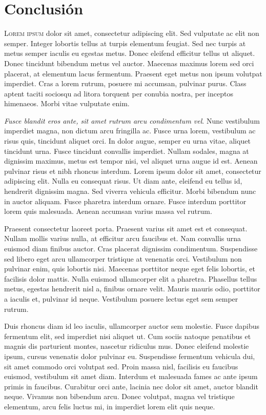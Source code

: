 \chapter*{Conclusión}



\noindent\textsc{Lorem ipsum} dolor sit amet, consectetur adipiscing elit. Sed vulputate ac elit non semper. Integer lobortis tellus at turpis elementum feugiat. Sed nec turpis at metus semper iaculis eu egestas metus. Donec eleifend efficitur tellus ut aliquet. Donec tincidunt bibendum metus vel auctor. Maecenas maximus lorem sed orci placerat, at elementum lacus fermentum. Praesent eget metus non ipsum volutpat imperdiet. Cras a lorem rutrum, posuere mi accumsan, pulvinar purus. Class aptent taciti sociosqu ad litora torquent per conubia nostra, per inceptos himenaeos. Morbi vitae vulputate enim.

\emph{Fusce blandit eros ante, sit amet rutrum arcu condimentum vel}. Nunc vestibulum imperdiet magna, non dictum arcu fringilla ac. Fusce urna lorem, vestibulum ac risus quis, tincidunt aliquet orci. In dolor augue, semper eu urna vitae, aliquet tincidunt urna. Fusce tincidunt convallis imperdiet. Nullam sodales, magna at dignissim maximus, metus est tempor nisi, vel aliquet urna augue id est. Aenean pulvinar risus et nibh rhoncus interdum. Lorem ipsum dolor sit amet, consectetur adipiscing elit. Nulla eu consequat risus. Ut diam ante, eleifend eu tellus id, hendrerit dignissim magna. Sed viverra vehicula efficitur. Morbi bibendum nunc in auctor aliquam. Fusce pharetra interdum ornare. Fusce interdum porttitor lorem quis malesuada. Aenean accumsan varius massa vel rutrum.

Praesent consectetur laoreet porta. Praesent varius sit amet est et consequat. Nullam mollis varius nulla, at efficitur arcu faucibus et. Nam convallis urna euismod diam finibus auctor. Cras placerat dignissim condimentum. Suspendisse sed libero eget arcu ullamcorper tristique at venenatis orci. Vestibulum non pulvinar enim, quis lobortis nisi. Maecenas porttitor neque eget felis lobortis, et facilisis dolor mattis. Nulla euismod ullamcorper elit a pharetra. Phasellus tellus metus, egestas hendrerit nisl a, finibus ornare velit. Mauris mauris odio, porttitor a iaculis et, pulvinar id neque. Vestibulum posuere lectus eget sem semper rutrum.

Duis rhoncus diam id leo iaculis, ullamcorper auctor sem molestie. Fusce dapibus fermentum elit, sed imperdiet nisi aliquet ut. Cum sociis natoque penatibus et magnis dis parturient montes, nascetur ridiculus mus. Donec eleifend molestie ipsum, cursus venenatis dolor pulvinar eu. Suspendisse fermentum vehicula dui, sit amet commodo orci volutpat sed. Proin massa nisl, facilisis eu faucibus euismod, vestibulum sit amet diam. Interdum et malesuada fames ac ante ipsum primis in faucibus. Curabitur orci ante, lacinia nec dolor sit amet, auctor blandit neque. Vivamus non bibendum arcu. Donec volutpat, magna vel tristique elementum, arcu felis luctus mi, in imperdiet lorem elit quis neque.

